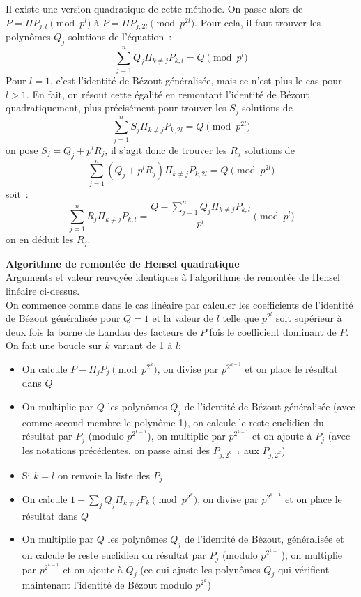 \documentclass[a4paper,11pt]{article}
\begin{document}
\begin{giacjshere}
Il existe une version quadratique de cette méthode. On passe alors de
$P=\Pi P_{j,l} \pmod {p^l}$ à $P=\Pi P_{j,2l} \pmod {p^{2l}}$. Pour
cela, il faut trouver les polynômes $Q_j$ solutions de l'équation~:
\[ \sum_{j=1}^n Q_j \Pi_{k\neq j} P_{k,l}=Q \pmod {p^l}\]
Pour $l=1$, c'est l'identité de Bézout généralisée, mais ce n'est plus le
cas pour $l>1$. En fait, on résout cette égalité en remontant l'identité
de Bézout quadratiquement, plus précisément pour trouver les $S_j$
solutions de
\[ \sum_{j=1}^n S_j \Pi_{k\neq j} P_{k,2l}=Q \pmod {p^{2l}}\]
on pose $S_j=Q_j+p^l R_j$, il s'agit donc de trouver les $R_j$ solutions de
\[ \sum_{j=1}^n (Q_j+p^l R_j) \Pi_{k\neq j} P_{k,2l}=Q \pmod {p^{2l}}\]
soit~:
\[ \sum_{j=1}^n R_j \Pi_{k\neq j} P_{k,l}
=\frac{Q-\sum_{j=1}^n Q_j \Pi_{k\neq j} P_{k,l} }{p^l} \pmod {p^l}\]
on en déduit les $R_j$.

{\bf Algorithme de remontée de Hensel quadratique}\\
Arguments et valeur renvoyée identiques à l'algorithme de remontée de Hensel
linéaire ci-dessus.\\
On commence comme dans le cas linéaire par calculer les coefficients
de l'identité de Bézout généralisée pour $Q=1$ et la valeur de $l$ telle
que $p^{2^l}$ soit supérieur à deux fois la borne de Landau des facteurs
de $P$ fois le coefficient dominant de $P$.\\
On fait une boucle sur $k$ variant de 1 à $l$:
\begin{itemize}
\item On calcule $P-\Pi_j P_j \pmod {p^{2^k}}$, on divise par $p^{2^{k-1}}$
et on place le résultat dans $Q$
\item On multiplie par $Q$ les polynômes $Q_j$ de l'identité de Bézout
généralisée (avec comme second membre le polynôme 1),
on calcule le reste euclidien du résultat par $P_j$ (modulo $p^{2^{k-1}}$), 
on multiplie par $p^{2^{k-1}}$ et on ajoute à $P_j$ (avec les notations
précédentes, on passe ainsi des $P_{j,2^{k-1}}$ aux $P_{j,2^k}$)
\item Si $k=l$ on renvoie la liste des $P_j$
\item On calcule $1-\sum_j Q_j \Pi_{k\neq j} P_k \pmod {p^{2^k}}$, on
divise par $p^{2^{k-1}}$ et on place le résultat dans $Q$
\item On multiplie par $Q$ les polynômes $Q_j$ de l'identité de Bézout,
généralisée et on calcule le reste euclidien du résultat par 
$P_j$ (modulo $p^{2^{k-1}}$), on multiplie par $p^{2^{k-1}}$ et 
on ajoute à $Q_j$ (ce qui ajuste les polynômes $Q_j$ qui vérifient
maintenant l'identité de Bézout modulo $p^{2^k}$)
\end{itemize}


\end{giacjshere}
\end{document}
